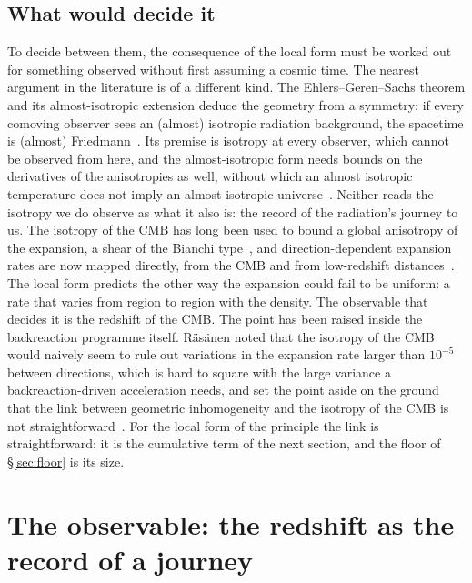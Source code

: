 \documentclass[11pt,a4paper]{article}
\begin{document}
\subsection{What would decide it}\label{sec:decide}

To decide between them, the consequence of the local form must be worked out for something observed without first assuming a cosmic time. The nearest argument in the literature is of a different kind. The Ehlers--Geren--Sachs theorem and its almost-isotropic extension deduce the geometry from a symmetry: if every comoving observer sees an (almost) isotropic radiation background, the spacetime is (almost) Friedmann~\cite{EGS1968, Stoeger1995}. Its premise is isotropy at every observer, which cannot be observed from here, and the almost-isotropic form needs bounds on the derivatives of the anisotropies as well, without which an almost isotropic temperature does not imply an almost isotropic universe~\cite{Nilsson1999}. Neither reads the isotropy we do observe as what it also is: the record of the radiation's journey to us. The isotropy of the CMB has long been used to bound a global anisotropy of the expansion, a shear of the Bianchi type~\cite{CollinsHawking1973, Saadeh2016}, and direction-dependent expansion rates are now mapped directly, from the CMB and from low-redshift distances~\cite{Zhou2025}. The local form predicts the other way the expansion could fail to be uniform: a rate that varies from region to region with the density. The observable that decides it is the redshift of the CMB. The point has been raised inside the backreaction programme itself. R\"as\"anen noted that the isotropy of the CMB would naively seem to rule out variations in the expansion rate larger than $10^{-5}$ between directions, which is hard to square with the large variance a backreaction-driven acceleration needs, and set the point aside on the ground that the link between geometric inhomogeneity and the isotropy of the CMB is not straightforward~\cite{Rasanen2006}. For the local form of the principle the link is straightforward: it is the cumulative term of the next section, and the floor of \S\ref{sec:floor} is its size.

\section{The observable: the redshift as the record of a journey}\label{sec:decomp}
\end{document}
